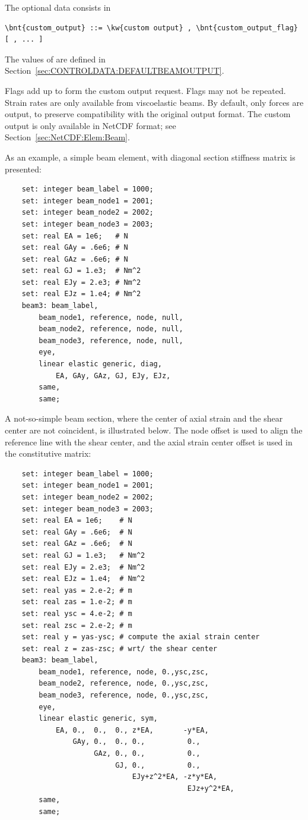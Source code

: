 The  optional data consists in
\begin{Verbatim}[commandchars=\\\{\}]
    \bnt{custom_output} ::= \kw{custom output} , \bnt{custom_output_flag} [ , ... ]
\end{Verbatim}
The values of 
are defined in Section~\ref{sec:CONTROLDATA:DEFAULTBEAMOUTPUT}.

Flags add up to form the custom output request.
Flags may not be repeated.
Strain rates are only available from viscoelastic beams.
By default, only forces are output, to preserve compatibility
with the original output format.
The custom output is only available in NetCDF format;
see Section~\ref{sec:NetCDF:Elem:Beam}.

As an example, a simple beam element, with diagonal section stiffness 
matrix is presented:
\begin{verbatim}
    set: integer beam_label = 1000;
    set: integer beam_node1 = 2001;
    set: integer beam_node2 = 2002;
    set: integer beam_node3 = 2003;
    set: real EA = 1e6;   # N
    set: real GAy = .6e6; # N
    set: real GAz = .6e6; # N
    set: real GJ = 1.e3;  # Nm^2
    set: real EJy = 2.e3; # Nm^2
    set: real EJz = 1.e4; # Nm^2
    beam3: beam_label,
        beam_node1, reference, node, null,
        beam_node2, reference, node, null,
        beam_node3, reference, node, null,
        eye,
        linear elastic generic, diag,
            EA, GAy, GAz, GJ, EJy, EJz,
        same,
        same;
\end{verbatim}

A not-so-simple beam section, where the center of axial strain 
and the shear center are not coincident, is illustrated below.
The node offset is used to align the reference line 
with the shear center, and the axial strain center offset 
is used in the constitutive matrix:
\begin{verbatim}
    set: integer beam_label = 1000;
    set: integer beam_node1 = 2001;
    set: integer beam_node2 = 2002;
    set: integer beam_node3 = 2003;
    set: real EA = 1e6;    # N
    set: real GAy = .6e6;  # N
    set: real GAz = .6e6;  # N
    set: real GJ = 1.e3;   # Nm^2
    set: real EJy = 2.e3;  # Nm^2
    set: real EJz = 1.e4;  # Nm^2
    set: real yas = 2.e-2; # m
    set: real zas = 1.e-2; # m
    set: real ysc = 4.e-2; # m
    set: real zsc = 2.e-2; # m
    set: real y = yas-ysc; # compute the axial strain center
    set: real z = zas-zsc; # wrt/ the shear center
    beam3: beam_label,
        beam_node1, reference, node, 0.,ysc,zsc,
        beam_node2, reference, node, 0.,ysc,zsc,
        beam_node3, reference, node, 0.,ysc,zsc,
        eye,
        linear elastic generic, sym,
            EA, 0.,  0.,  0., z*EA,       -y*EA,
                GAy, 0.,  0., 0.,          0.,
                     GAz, 0., 0.,          0.,
                          GJ, 0.,          0.,
                              EJy+z^2*EA, -z*y*EA,
                                           EJz+y^2*EA,
        same,
        same;
\end{verbatim}


